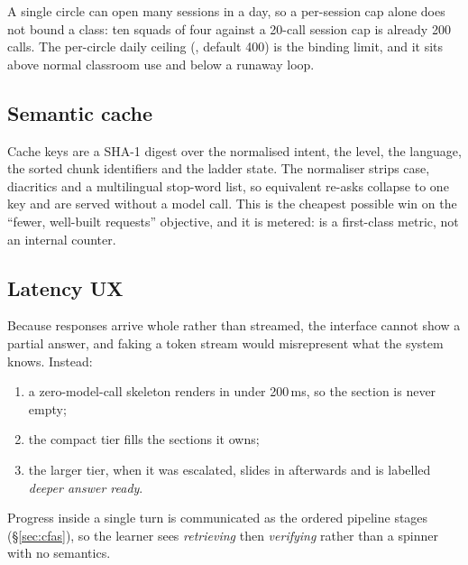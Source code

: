 A single circle can open many sessions in a day, so a per-session cap alone does not bound
a class: ten squads of four against a 20-call session cap is already 200 calls. The
per-circle daily ceiling (, default 400) is the binding limit,
and it sits above normal classroom use and below a runaway loop.

\subsection{Semantic cache}

Cache keys are a SHA-1 digest over the normalised intent, the level, the language, the
sorted chunk identifiers and the ladder state. The normaliser strips case, diacritics and a
multilingual stop-word list,
so equivalent re-asks collapse to one key and are served without a model call. This is the
cheapest possible win on the ``fewer, well-built requests'' objective, and it is metered:
 is a first-class metric, not an internal counter.

\subsection{Latency UX}
\label{sec:latency-ux}

Because responses arrive whole rather than streamed, the interface cannot show a partial
answer, and faking a token stream would misrepresent what the system knows. Instead:

\begin{enumerate}[leftmargin=1.6em,itemsep=2pt]
  \item a zero-model-call skeleton renders in under 200\,ms, so the section is never empty;
  \item the compact tier fills the sections it owns;
  \item the larger tier, when it was escalated, slides in afterwards and is labelled
        \emph{deeper answer ready}.
\end{enumerate}

Progress inside a single turn is communicated as the ordered pipeline stages
(\S\ref{sec:cfas}), so the learner sees \emph{retrieving} then \emph{verifying} rather than
a spinner with no semantics.
